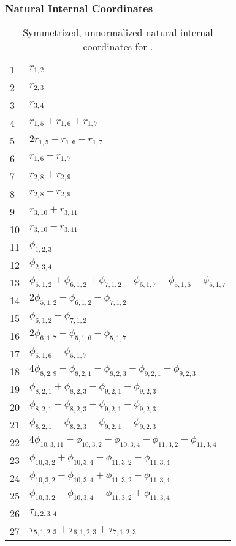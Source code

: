 \documentclass[10pt,oneside]{article}
\begin{document}
\subsubsection*{Natural Internal Coordinates}
\begin{table}[h!]
\centering
\caption{Symmetrized, unnormalized natural internal coordinates for .}
\small
\begin{tabular}{ll}
  1   & $r_{1,2}$ \\
  2   & $r_{2,3}$ \\
  3   & $r_{3,4}$ \\
  4   & $r_{1,5} + r_{1,6} + r_{1,7}$ \\
  5   & $2r_{1,5} - r_{1,6} - r_{1,7}$ \\
  6   & $r_{1,6} - r_{1,7}$ \\
  7   & $r_{2,8} + r_{2,9}$ \\
  8   & $r_{2,8} - r_{2,9}$ \\
  9   & $r_{3,10} + r_{3,11}$ \\
  10  & $r_{3,10} - r_{3,11}$ \\
  11  & $\phi_{1,2,3}$ \\
  12  & $\phi_{2,3,4}$ \\
  13  & $\phi_{5,1,2} + \phi_{6,1,2} + \phi_{7,1,2} - \phi_{6,1,7} - \phi_{5,1,6} - \phi_{5,1,7}$ \\
  14  & $2\phi_{5,1,2} - \phi_{6,1,2} - \phi_{7,1,2}$ \\
  15  & $\phi_{6,1,2} - \phi_{7,1,2}$ \\
  16  & $2\phi_{6,1,7} - \phi_{5,1,6} - \phi_{5,1,7}$ \\
  17  & $\phi_{5,1,6} - \phi_{5,1,7}$ \\
  18  & $4\phi_{8,2,9} - \phi_{8,2,1} - \phi_{8,2,3} - \phi_{9,2,1} - \phi_{9,2,3}$ \\
  19  & $\phi_{8,2,1} + \phi_{8,2,3} - \phi_{9,2,1} - \phi_{9,2,3}$ \\
  20  & $\phi_{8,2,1} - \phi_{8,2,3} + \phi_{9,2,1} - \phi_{9,2,3}$ \\
  21  & $\phi_{8,2,1} - \phi_{8,2,3} - \phi_{9,2,1} + \phi_{9,2,3}$ \\
  22  & $4\phi_{10,3,11} - \phi_{10,3,2} - \phi_{10,3,4} - \phi_{11,3,2} - \phi_{11,3,4}$ \\
  23  & $\phi_{10,3,2} + \phi_{10,3,4} - \phi_{11,3,2} - \phi_{11,3,4}$ \\
  24  & $\phi_{10,3,2} - \phi_{10,3,4} + \phi_{11,3,2} - \phi_{11,3,4}$ \\
  25  & $\phi_{10,3,2} - \phi_{10,3,4} - \phi_{11,3,2} + \phi_{11,3,4}$ \\
  26  & $\tau_{1,2,3,4}$ \\
  27  & $\tau_{5,1,2,3} + \tau_{6,1,2,3} + \tau_{7,1,2,3}$ \\
\end{tabular}
\end{table}
\end{document}
